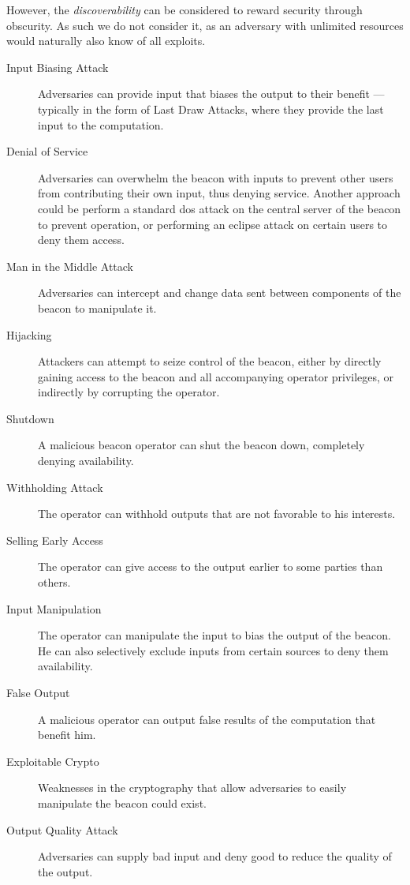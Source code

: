 However, the \emph{discoverability} can be considered to reward security through obscurity. As such we do not consider it, as an adversary with unlimited resources would naturally also know of all exploits.
\begin{description}
    \item [Input Biasing Attack] Adversaries can provide input that biases the output to their benefit --- typically in the form of Last Draw Attacks, where they provide the last input to the computation.
    \item [Denial of Service] Adversaries can overwhelm the beacon with inputs to prevent other users from contributing their own input, thus denying service. Another approach could be perform a standard \gls{dos} attack on the central server of the beacon to prevent operation, or performing an eclipse attack on certain users to deny them access.
    \item [Man in the Middle Attack] Adversaries can intercept and change data sent between components of the beacon to manipulate it.
    \item [Hijacking] Attackers can attempt to seize control of the beacon, either by directly gaining access to the beacon and all accompanying operator privileges, or indirectly by corrupting the operator.
    \item [Shutdown] A malicious beacon operator can shut the beacon down, completely denying availability.
    \item [Withholding Attack] The operator can withhold outputs that are not favorable to his interests.
    \item [Selling Early Access] The operator can give access to the output earlier to some parties than others.
    \item [Input Manipulation] The operator can manipulate the input to bias the output of the beacon. He can also selectively exclude inputs from certain sources to deny them availability.
    \item [False Output] A malicious operator can output false results of the computation that benefit him.
    \item [Exploitable Crypto] Weaknesses in the cryptography that allow adversaries to easily manipulate the beacon could exist.
    \item [Output Quality Attack] Adversaries can supply bad input and deny good to reduce the quality of the output.

\end{description}

